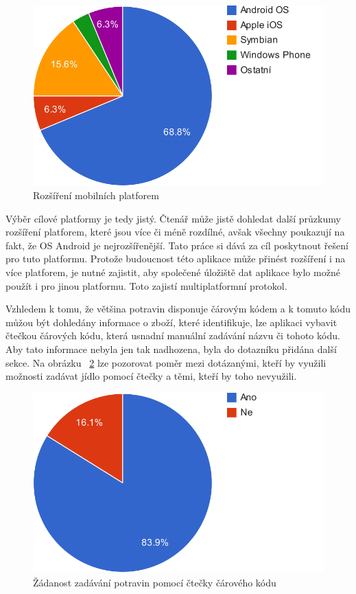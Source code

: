 \documentclass[thesis=B,czech]{FITthesis}[2013/10/20]
\begin{document}
\begin{figure}[H]
  \centering
  \includegraphics[scale=0.8]{charts/survey_os}
  \caption{Rozšíření mobilních platforem}
  \label{fig:SurveyOS}
\end{figure}

Výběr cílové platformy je tedy jistý. Čtenář může jistě dohledat další průzkumy rozšíření platforem, které jsou více či méně rozdílné, avšak všechny poukazují na fakt, že OS Android je nejrozšířenější. Tato práce si dává za cíl poskytnout řešení pro tuto platformu. Protože budoucnost této aplikace může přinést rozšíření i na více platforem, je nutné zajistit, aby společené úložiště dat aplikace bylo možné použít i pro jinou platformu. Toto zajistí multiplatformní protokol.

Vzhledem k tomu, že většina potravin disponuje čárovým kódem a k tomuto kódu můžou být dohledány informace o zboží, které identifikuje, lze aplikaci vybavit čtečkou čárových kódu, která usnadní manuální zadávání názvu či tohoto kódu. Aby tato informace nebyla jen tak nadhozena, byla do dotazníku přidána další sekce. Na obrázku ~\ref{fig:SurveyScan} lze pozorovat poměr mezi dotázanými, kteří by využili možnosti zadávat jídlo pomocí čtečky a těmi, kteří by toho nevyužili.

\begin{figure}[H]
  \centering
  \includegraphics[scale=0.8]{charts/survey_scan}
  \caption{Žádanost zadávání potravin pomocí čtečky čárového kódu}
  \label{fig:SurveyScan}
\end{figure}
\end{document}
